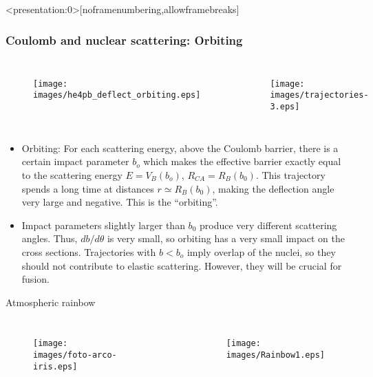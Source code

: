 \documentclass[english,10pt]{beamer}
\newcommand{\gitem}[1]{\item {\textcolor{deepcarmine}{  #1}}}
\newcommand{\images}{images}
\begin{document}
\begin{frame}<presentation:0>[noframenumbering,allowframebreaks]
\frametitle{Coulomb and nuclear scattering: Orbiting}

\begin{columns}[T]
\begin{figure}{\par \resizebox*{0.85\textwidth}{!}
{\texttt{[image: \\images/he4pb\_deflect\_orbiting.eps]}} \par}
\end{figure}
%
\begin{figure}{\par \resizebox*{0.6\textwidth}{!}
{\texttt{[image: \\images/trajectories-3.eps]}} \par}
\end{figure}
\end{columns}

\bigskip

\begin{itemize}
 \footnotesize
\gitem{Orbiting:} For each scattering energy, above the Coulomb barrier, there is a certain impact parameter $b_o$ which makes the effective barrier exactly equal to the scattering energy $E= V_B(b_o)$, $R_{CA} = R_B(b_0)$. This trajectory spends a long time at distances $r \simeq R_B(b_0)$,  making  the deflection angle very large and negative. This is the ``orbiting''.
\item Impact parameters slightly larger than  $b_0$ produce very different scattering angles. Thus, $db/d \theta$ is very small, so orbiting has a very small impact on the cross sections. Trajectories with $b < b_o$ imply overlap of the nuclei, so they should not contribute to elastic scattering. However, they will be crucial for fusion.
\end{itemize}
\end{frame}



\begin{frame}{Atmospheric rainbow}

\begin{columns}[T]
\begin{figure}{\par \resizebox*{0.9\textwidth}{!}
{\texttt{[image: \\images/foto-arco-iris.eps]}} \par}
\end{figure}
\begin{figure}{\par \resizebox*{0.9\textwidth}{!}
{\texttt{[image: \\images/Rainbow1.eps]}} \par}
\end{figure}
\end{columns}

\end{frame}
\end{document}
